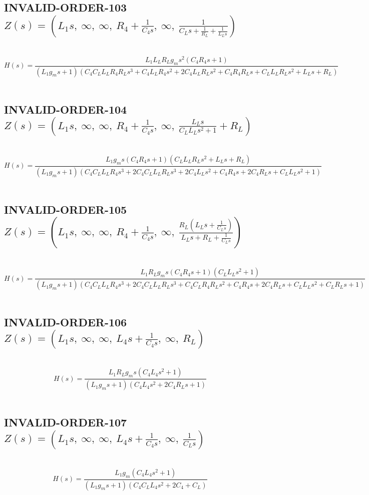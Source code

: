 \documentclass{article}
\begin{document}
\subsection{INVALID-ORDER-103 $Z(s) = \left( L_{1} s, \  \infty, \  \infty, \  R_{4} + \frac{1}{C_{4} s}, \  \infty, \  \frac{1}{C_{L} s + \frac{1}{R_{L}} + \frac{1}{L_{L} s}}\right)$ } \ 
\textbf{\[H(s) = \frac{L_{1} L_{L} R_{L} g_{m} s^{2} \left(C_{4} R_{4} s + 1\right)}{\left(L_{1} g_{m} s + 1\right) \left(C_{4} C_{L} L_{L} R_{4} R_{L} s^{3} + C_{4} L_{L} R_{4} s^{2} + 2 C_{4} L_{L} R_{L} s^{2} + C_{4} R_{4} R_{L} s + C_{L} L_{L} R_{L} s^{2} + L_{L} s + R_{L}\right)}\] } \ 
\subsection{INVALID-ORDER-104 $Z(s) = \left( L_{1} s, \  \infty, \  \infty, \  R_{4} + \frac{1}{C_{4} s}, \  \infty, \  \frac{L_{L} s}{C_{L} L_{L} s^{2} + 1} + R_{L}\right)$ } \ 
\textbf{\[H(s) = \frac{L_{1} g_{m} s \left(C_{4} R_{4} s + 1\right) \left(C_{L} L_{L} R_{L} s^{2} + L_{L} s + R_{L}\right)}{\left(L_{1} g_{m} s + 1\right) \left(C_{4} C_{L} L_{L} R_{4} s^{3} + 2 C_{4} C_{L} L_{L} R_{L} s^{3} + 2 C_{4} L_{L} s^{2} + C_{4} R_{4} s + 2 C_{4} R_{L} s + C_{L} L_{L} s^{2} + 1\right)}\] } \ 
\subsection{INVALID-ORDER-105 $Z(s) = \left( L_{1} s, \  \infty, \  \infty, \  R_{4} + \frac{1}{C_{4} s}, \  \infty, \  \frac{R_{L} \left(L_{L} s + \frac{1}{C_{L} s}\right)}{L_{L} s + R_{L} + \frac{1}{C_{L} s}}\right)$ } \ 
\textbf{\[H(s) = \frac{L_{1} R_{L} g_{m} s \left(C_{4} R_{4} s + 1\right) \left(C_{L} L_{L} s^{2} + 1\right)}{\left(L_{1} g_{m} s + 1\right) \left(C_{4} C_{L} L_{L} R_{4} s^{3} + 2 C_{4} C_{L} L_{L} R_{L} s^{3} + C_{4} C_{L} R_{4} R_{L} s^{2} + C_{4} R_{4} s + 2 C_{4} R_{L} s + C_{L} L_{L} s^{2} + C_{L} R_{L} s + 1\right)}\] } \ 
\subsection{INVALID-ORDER-106 $Z(s) = \left( L_{1} s, \  \infty, \  \infty, \  L_{4} s + \frac{1}{C_{4} s}, \  \infty, \  R_{L}\right)$ } \ 
\textbf{\[H(s) = \frac{L_{1} R_{L} g_{m} s \left(C_{4} L_{4} s^{2} + 1\right)}{\left(L_{1} g_{m} s + 1\right) \left(C_{4} L_{4} s^{2} + 2 C_{4} R_{L} s + 1\right)}\] } \ 
\subsection{INVALID-ORDER-107 $Z(s) = \left( L_{1} s, \  \infty, \  \infty, \  L_{4} s + \frac{1}{C_{4} s}, \  \infty, \  \frac{1}{C_{L} s}\right)$ } \ 
\textbf{\[H(s) = \frac{L_{1} g_{m} \left(C_{4} L_{4} s^{2} + 1\right)}{\left(L_{1} g_{m} s + 1\right) \left(C_{4} C_{L} L_{4} s^{2} + 2 C_{4} + C_{L}\right)}\] } \ 
\end{document}
